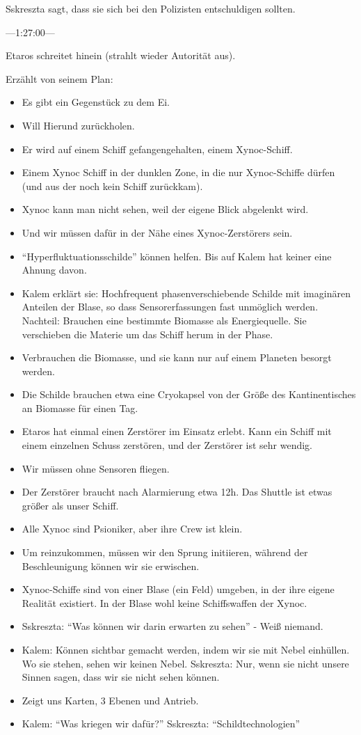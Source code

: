 \documentclass[11pt]{scrartcl}
\begin{document}
Sskreszta sagt, dass sie sich bei den Polizisten entschuldigen sollten.

---1:27:00---

Etaros schreitet hinein (strahlt wieder Autorität aus).

Erzählt von seinem Plan:

\begin{itemize}
\item
  Es gibt ein Gegenstück zu dem Ei.
\item
  Will Hierund zurückholen.
\item
  Er wird auf einem Schiff gefangengehalten, einem Xynoc-Schiff.
\item
  Einem Xynoc Schiff in der dunklen Zone, in die nur Xynoc-Schiffe
  dürfen (und aus der noch kein Schiff zurückkam).
\item
  Xynoc kann man nicht sehen, weil der eigene Blick abgelenkt wird.
\item
  Und wir müssen dafür in der Nähe eines Xynoc-Zerstörers sein.
\item
  ``Hyperfluktuationsschilde'' können helfen. Bis auf Kalem hat keiner
  eine Ahnung davon.
\item
  Kalem erklärt sie: Hochfrequent phasenverschiebende Schilde mit
  imaginären Anteilen der Blase, so dass Sensorerfassungen fast
  unmöglich werden. Nachteil: Brauchen eine bestimmte Biomasse als
  Energiequelle. Sie verschieben die Materie um das Schiff herum in der
  Phase.
\item
  Verbrauchen die Biomasse, und sie kann nur auf einem Planeten besorgt
  werden.
\item
  Die Schilde brauchen etwa eine Cryokapsel von der Größe des
  Kantinentisches an Biomasse für einen Tag.
\item
  Etaros hat einmal einen Zerstörer im Einsatz erlebt. Kann ein Schiff
  mit einem einzelnen Schuss zerstören, und der Zerstörer ist sehr
  wendig.
\item
  Wir müssen ohne Sensoren fliegen.
\item
  Der Zerstörer braucht nach Alarmierung etwa 12h. Das Shuttle ist etwas
  größer als unser Schiff.
\item
  Alle Xynoc sind Psioniker, aber ihre Crew ist klein.
\item
  Um reinzukommen, müssen wir den Sprung initiieren, während der
  Beschleunigung können wir sie erwischen.
\item
  Xynoc-Schiffe sind von einer Blase (ein Feld) umgeben, in der ihre
  eigene Realität existiert. In der Blase wohl keine Schiffswaffen der
  Xynoc.
\item
  Sskreszta: ``Was können wir darin erwarten zu sehen'' - Weiß niemand.
\item
  Kalem: Können sichtbar gemacht werden, indem wir sie mit Nebel
  einhüllen. Wo sie stehen, sehen wir keinen Nebel. Sskreszta: Nur, wenn
  sie nicht unsere Sinnen sagen, dass wir sie nicht sehen können.
\item
  Zeigt uns Karten, 3 Ebenen und Antrieb.
\item
  Kalem: ``Was kriegen wir dafür?'' Sskreszta: ``Schildtechnologien''
\end{itemize}
\end{document}
